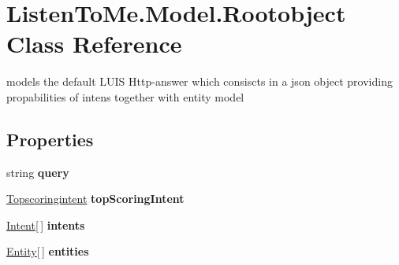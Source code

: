 \hypertarget{class_listen_to_me_1_1_model_1_1_rootobject}{}\section{Listen\+To\+Me.\+Model.\+Rootobject Class Reference}
\label{class_listen_to_me_1_1_model_1_1_rootobject}


models the default L\+U\+IS Http-\/answer which consiscts in a json object providing propabilities of intens together with entity model  


\subsection*{Properties}
\begin{DoxyCompactItemize}
\item 
string {\bfseries query}\hypertarget{class_listen_to_me_1_1_model_1_1_rootobject_adad3e848ab548426bf08f2a4e72406d9}{}\label{class_listen_to_me_1_1_model_1_1_rootobject_adad3e848ab548426bf08f2a4e72406d9}

\item 
\hyperlink{class_listen_to_me_1_1_model_1_1_topscoringintent}{Topscoringintent} {\bfseries top\+Scoring\+Intent}\hypertarget{class_listen_to_me_1_1_model_1_1_rootobject_a01604703f06c73a21555365a7619b6a5}{}\label{class_listen_to_me_1_1_model_1_1_rootobject_a01604703f06c73a21555365a7619b6a5}

\item 
\hyperlink{class_listen_to_me_1_1_model_1_1_intent}{Intent}\mbox{[}$\,$\mbox{]} {\bfseries intents}\hypertarget{class_listen_to_me_1_1_model_1_1_rootobject_ad59ca4d5e32b1963884203c0e83c8e18}{}\label{class_listen_to_me_1_1_model_1_1_rootobject_ad59ca4d5e32b1963884203c0e83c8e18}

\item 
\hyperlink{class_listen_to_me_1_1_model_1_1_entity}{Entity}\mbox{[}$\,$\mbox{]} {\bfseries entities}\hypertarget{class_listen_to_me_1_1_model_1_1_rootobject_a95eb6979506b4876f2fd9ef010706d1f}{}\label{class_listen_to_me_1_1_model_1_1_rootobject_a95eb6979506b4876f2fd9ef010706d1f}

\end{DoxyCompactItemize}


